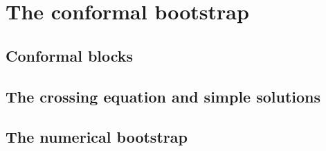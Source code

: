 \documentclass[a4paper,12pt]{article}
\numberwithin{equation}{section}
\begin{document}
\section{The conformal bootstrap}
\label{sec:bootstrap}

%
%
%
%
%
%
%


\subsection{Conformal blocks}

%
%
%
%


\subsection{The crossing equation and simple solutions}


%
%





\subsection{The numerical bootstrap}

%
%
%
%

%
%
%
%
%
%
%
\end{document}
